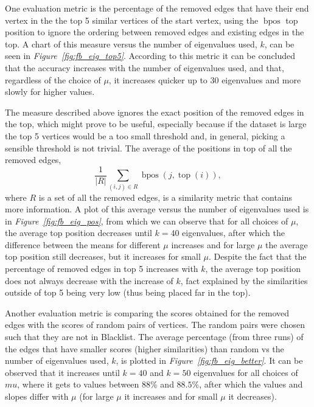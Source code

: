 \documentclass[12pt]{report}
\DeclareMathOperator{\ttop}{top}
\DeclareMathOperator{\bpos}{bpos}
\begin{document}
One evaluation metric is the percentage of the removed edges that have
their end vertex in the the top 5 similar vertices of the start vertex, using
the $\bpos$ top position to ignore the ordering between removed edges and
existing edges in the top. A chart of this measure versus the number of
eigenvalues used, $k$, can be seen in \emph{Figure~\ref{fig:fb_eig_top5}}.
According to this metric it can be concluded that the accuracy increases with
the number of eigenvalues used, and that, regardless of the choice of $\mu$,
it increases quicker up to 30 eigenvalues and more slowly for higher values.

The measure described above ignores the exact position of the removed edges in
the top, which might prove to be useful, especially because if the dataset is
large the top 5 vertices would be a too small threshold and, in general, picking
a sensible threshold is not trivial. The average of the positions in top of
all the removed edges,
\begin{equation}
  \frac{1}{|R|} \sum_{(i,j) \in R} \bpos(j, \ttop(i)),
\end{equation}
where $R$ is a set of all the removed edges, is a similarity metric that contains
more information. A plot of this average versus the number of eigenvalues used
is in \emph{Figure~\ref{fig:fb_eig_pos}}, from which we can observe that for
all choices of $\mu$, the average top position decreases until $k=40$
eigenvalues, after which the difference between the means for different $\mu$
increases and for large $\mu$ the average top position still decreases, but it
increases for small $\mu$. Despite the fact that the percentage of removed edges
in top 5 increases with $k$, the average top position does not always decrease
with the increase of $k$, fact explained by the similarities outside of top 5
being very low (thus being placed far in the top).


Another evaluation metric is comparing the scores obtained for the removed edges
with the scores of random pairs of vertices. The random pairs were chosen such
that they are not in Blacklist. The average percentage (from three runs) of
the edges that have smaller scores (higher similarities) than random vs the
number of eigenvalues used, $k$, is plotted in \emph{Figure~\ref{fig:fb_eig_better}}.
It can be observed that it increases until $k=40$ and $k=50$ eigenvalues for all
choices of $mu$, where it gets to values between $88\%$ and $88.5\%$, after
which the values and slopes differ with $\mu$ (for large $\mu$ it increases and
for small $\mu$ it decreases).
\end{document}
